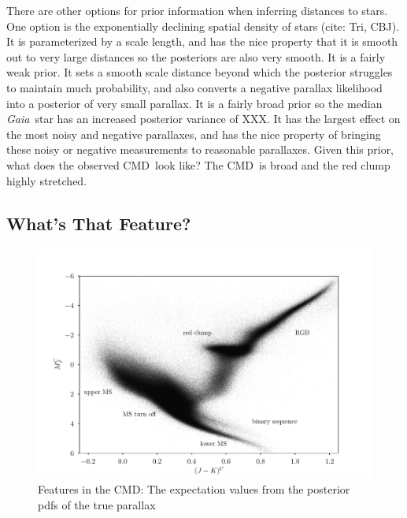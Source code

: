 \documentclass[modern]{aastex61}
\newcommand{\acronym}[1]{{\small{#1}}}
\newcommand{\project}[1]{\textsl{#1}}
\newcommand{\gaia}{\project{Gaia}}
\newcommand{\cmd}{\acronym{CMD}}
\begin{document}
There are other options for prior information when inferring distances to stars. One option is the exponentially declining spatial density of stars (cite: Tri, CBJ). It is parameterized by a scale length, and has the nice property that it is smooth out to very large distances so the posteriors are also very smooth. It is a fairly weak prior. It sets a smooth scale distance beyond which the posterior struggles to maintain much probability, and also converts a negative parallax likelihood into a posterior of very small parallax. It is a fairly broad prior so the median \gaia\ star has an increased posterior variance of XXX. It has the largest effect on the most noisy and negative parallaxes, and has the nice property of bringing these noisy or negative measurements to reasonable parallaxes. Given this prior, what does the observed \cmd\ look like?  The \cmd\ is broad and the red clump highly stretched.


\subsection{What's That Feature?}
\begin{figure}
\centering
  \includegraphics[width=\textwidth]{whatsThatFeature.pdf}
\caption{Features in the \cmd: The expectation values from the posterior pdfs of the true parallax}
\label{fig:wtf}
\end{figure}
\end{document}
